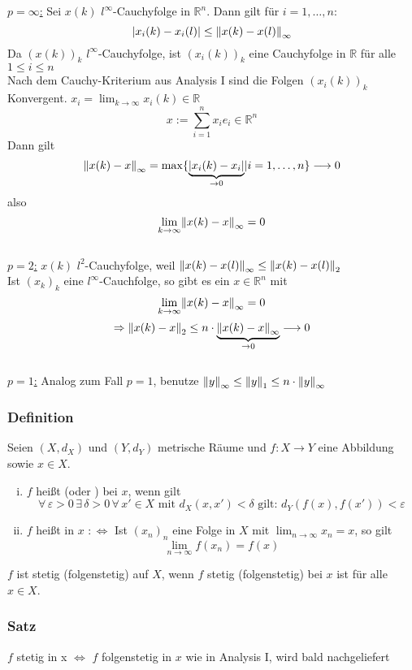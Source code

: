 \underline{$p=\infty$:} Sei $x(k)$ $l^{\infty}$-Cauchyfolge in $\mathbb{R}^n$. Dann gilt für $i=1,\dots,n$:
\[
	\abs{x_i(k)-x_i(l)} \leq \norm{x(k)-x(l)}_{\infty}
\]
Da $(x(k))_k$ $l^{\infty}$-Cauchyfolge, ist $(x_i(k))_k$ eine Cauchyfolge in $\mathbb{R}$ für alle $1\leq i \leq n$ \\
Nach dem Cauchy-Kriterium aus Analysis I sind die Folgen $(x_i(k))_k$ Konvergent. $x_i=\lim_{k \to \infty}x_i(k) \in \mathbb{R}$
\[
	x := \sum_{i=1}^{n}x_ie_i \in \mathbb{R}^n
\] 
Dann gilt 
\[
	\norm{x(k)-x}_{\infty} = \max\{ \underset{\to 0}{\underbrace{\abs{x_i(k)-x_i}}} | i=1,\dots,n \} \longrightarrow 0
\]
also
\[
	\lim_{k \to \infty}\norm{x(k)-x}_{\infty} = 0
\]
\\
\underline{$p=2$:}
$x(k)$ $l^2$-Cauchyfolge, weil $\norm{x(k)-x(l)}_{\infty} \leq \norm{x(k)-x(l)}_2$ \\
Ist $(x_k)_k$ eine $l^{\infty}$-Cauchfolge, so gibt es ein $x \in \mathbb{R}^n$ mit 
\[
	\lim_{k \to \infty}\norm{x(k)-x}_{\infty}=0
\]
\[
	\Rightarrow \norm{x(k)-x}_2 \leq n \cdot \underset{\to 0}{\underbrace{\norm{x(k)-x}_{\infty}}} \longrightarrow 0
\] 
\\
\underline{$p=1$:} Analog zum Fall $p=1$, benutze $\norm{y}_{\infty} \leq \norm{y}_1 \leq n \cdot \norm{y}_{\infty}$ 
\bewende	
\subsubsection[Stetigkeit]{Definition} %
\label{ssub:definition}
Seien $(X,d_X)$ und $(Y,d_Y)$ metrische Räume und $f:X \to Y$ eine Abbildung sowie $x \in X$.
\begin{enumerate}[(i)]
	\item $f$ heißt  (oder ) bei $x$, wenn gilt
	\[
		\forall\, \varepsilon >0 \, \exists \, \delta>0 \, \forall\, x' \in X \text{ mit } d_X(x,x')< \delta \text{ gilt: } d_Y(f(x),f(x'))<\varepsilon 
	\]
	\item $f$ heißt  in $x$ $:\Leftrightarrow$ Ist $(x_n)_n $ eine Folge in $X$ mit $\lim_{n \to \infty}x_n=x$, so gilt
	\[
		\lim_{n \to \infty}f(x_n)=f(x)
	\]
\end{enumerate}
$f$ ist stetig (folgenstetig) auf $X$, wenn $f$ stetig (folgenstetig) bei $x$ ist für alle $x \in X$.

\subsubsection{Satz} %
\label{ssub:satz}
$f$ stetig in x $\Leftrightarrow$ $f$ folgenstetig in $x$
 wie in Analysis I, wird bald nachgeliefert

